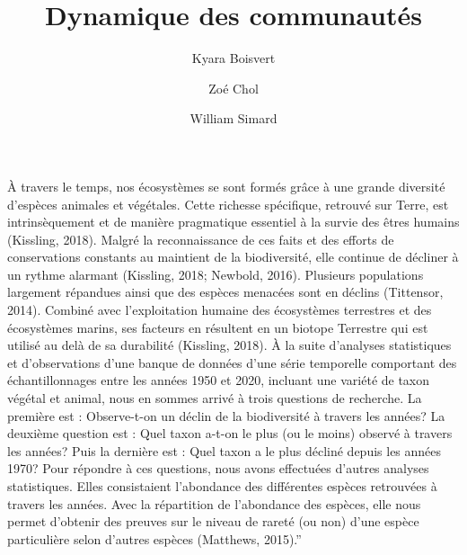 \documentclass[9pt,twocolumn,twoside,]{pnas-new}
\title{Dynamique des communautés}
\author[a]{Kyara Boisvert}
\author[a]{Zoé Chol}
\author[a]{William Simard}
\affil[a]{Université de Sherbrooke, Département d'écologie, 2500
Boulevard de l'Université, Sherbrooke, Québec, J1N 3C6}
\begin{document}
\verticaladjustment{-2pt}



\maketitle
\thispagestyle{firststyle}


\acknow{}

À travers le temps, nos écosystèmes se sont formés grâce à une grande
diversité d'espèces animales et végétales. Cette richesse spécifique,
retrouvé sur Terre, est intrinsèquement et de manière pragmatique
essentiel à la survie des êtres humains (Kissling, 2018). Malgré la
reconnaissance de ces faits et des efforts de conservations constants au
maintient de la biodiversité, elle continue de décliner à un rythme
alarmant (Kissling, 2018; Newbold, 2016). Plusieurs populations
largement répandues ainsi que des espèces menacées sont en déclins
(Tittensor, 2014). Combiné avec l'exploitation humaine des écosystèmes
terrestres et des écosystèmes marins, ses facteurs en résultent en un
biotope Terrestre qui est utilisé au delà de sa durabilité (Kissling,
2018). À la suite d'analyses statistiques et d'observations d'une banque
de données d'une série temporelle comportant des échantillonnages entre
les années 1950 et 2020, incluant une variété de taxon végétal et
animal, nous en sommes arrivé à trois questions de recherche. La
première est : Observe-t-on un déclin de la biodiversité à travers les
années? La deuxième question est : Quel taxon a-t-on le plus (ou le
moins) observé à travers les années? Puis la dernière est : Quel taxon a
le plus décliné depuis les années 1970? Pour répondre à ces questions,
nous avons effectuées d'autres analyses statistiques. Elles consistaient
l'abondance des différentes espèces retrouvées à travers les années.
Avec la répartition de l'abondance des espèces, elle nous permet
d'obtenir des preuves sur le niveau de rareté (ou non) d'une espèce
particulière selon d'autres espèces (Matthews, 2015).''
\end{document}
